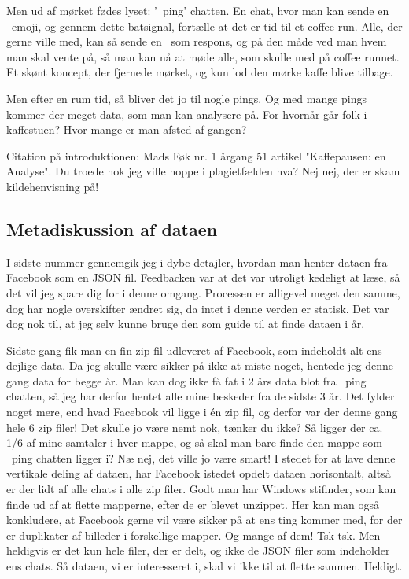 \begin{article}
Men ud af mørket fødes lyset: '\coffee\ ping' chatten.
En chat, hvor man kan sende en \coffee\ emoji, og gennem dette batsignal, fortælle at det er tid til et coffee run. Alle, der gerne ville med, kan så sende en \coffee\ som respons, og på den måde ved man hvem man skal vente på, så man kan nå at møde alle, som skulle med på coffee runnet. Et skønt koncept, der fjernede mørket, og kun lod den mørke kaffe blive tilbage.

Men efter en rum tid, så bliver det jo til nogle pings. Og med mange pings kommer der meget data, som man kan analysere på. For hvornår går folk i kaffestuen? Hvor mange er man afsted af gangen?

Citation på introduktionen: Mads Føk nr. 1 årgang 51 artikel "Kaffepausen: en Analyse".
Du troede nok jeg ville hoppe i plagietfælden hva? Nej nej, der er skam kildehenvisning på!


\subsection*{Metadiskussion af dataen}

I sidste nummer gennemgik jeg i dybe detajler, hvordan man henter dataen fra Facebook som en JSON fil. Feedbacken var at det var utroligt kedeligt at læse, så det vil jeg spare dig for i denne omgang. Processen er alligevel meget den samme, dog har nogle overskifter ændret sig, da intet i denne verden er statisk. Det var dog nok til, at jeg selv kunne bruge den som guide til at finde dataen i år.

Sidste gang fik man en fin zip fil udleveret af Facebook, som indeholdt alt ens dejlige data.
Da jeg skulle være sikker på ikke at miste noget, hentede jeg denne gang data for begge år. Man kan dog ikke få fat i 2 års data blot fra \coffee\ ping chatten, så jeg har derfor hentet alle mine beskeder fra de sidste 3 år.
Det fylder noget mere, end hvad Facebook vil ligge i én zip fil, og derfor var der denne gang hele 6 zip filer!
Det skulle jo være nemt nok, tænker du ikke? Så ligger der ca. 1/6 af mine samtaler i hver mappe, og så skal man bare finde den mappe som \coffee\ ping chatten ligger i?
Næ nej, det ville jo være smart! I stedet for at lave denne vertikale deling af dataen, har Facebook istedet opdelt dataen horisontalt, altså er der lidt af alle chats i alle zip filer. Godt man har Windows stifinder, som kan finde ud af at flette mapperne, efter de er blevet unzippet.
Her kan man også konkludere, at Facebook gerne vil være sikker på at ens ting kommer med, for der er duplikater af billeder i forskellige mapper. Og mange af dem! Tsk tsk.
Men heldigvis er det kun hele filer, der er delt, og ikke de JSON filer som indeholder ens chats. Så dataen, vi er interesseret i, skal vi ikke til at flette sammen. Heldigt.


\end{article}
